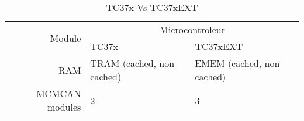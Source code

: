 
\begin{table}[htbp]
  \centering
    \begin{tabular}{|r||l|l|}
	\hline
	\multirow{2}{*}{Module} & \multicolumn{2}{c|}{Microcontroleur}\\
	\cline{2-3}
	& TC37x & TC37xEXT \\
	\hline \hline
	    RAM & TRAM (cached, non-cached) & EMEM (cached, non-cached) \\
	    \hline
	    MCMCAN modules & 2 & 3 \\
	    \hline
	\hline
    \end{tabular}
  \caption{TC37x Vs TC37xEXT}
  \label{tab:tc37x_delta}
\end{table}
